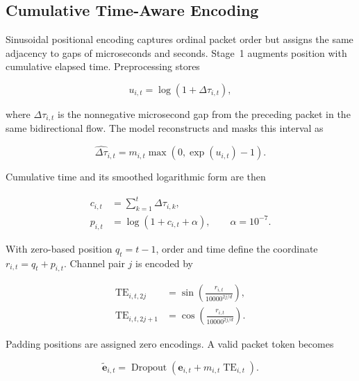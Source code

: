 \documentclass[11pt,fleqn]{report}
\begin{document}
\subsection{Cumulative Time-Aware Encoding}
\label{subsubsec:time_aware_encoding}

Sinusoidal positional encoding captures ordinal packet order but assigns the same adjacency to gaps of microseconds and seconds. Stage~1 augments position with cumulative elapsed time. Preprocessing stores

\begin{equation}
    u_{i,t}=\log\left(1+\Delta\tau_{i,t}\right),
    \label{eq:stored_log_iat}
\end{equation}

where $\Delta\tau_{i,t}$ is the nonnegative microsecond gap from the preceding packet in the same bidirectional flow. The model reconstructs and masks this interval as

\begin{equation}
    \widehat{\Delta\tau}_{i,t}
    =m_{i,t}\max\left(0,\exp(u_{i,t})-1\right).
    \label{eq:reconstructed_iat}
\end{equation}

Cumulative time and its smoothed logarithmic form are then

\begin{align}
    c_{i,t} &= \sum_{k=1}^{t}\widehat{\Delta\tau}_{i,k},\\
    p_{i,t} &= \log\left(1+c_{i,t}+\alpha\right),
    \qquad \alpha=10^{-7}.
    \label{eq:cumulative_time_feature}
\end{align}

With zero-based position $q_t=t-1$, order and time define the coordinate $r_{i,t}=q_t+p_{i,t}$. Channel pair $j$ is encoded by

\begin{align}
    \operatorname{TE}_{i,t,2j}
    &=\sin\left(
        \frac{r_{i,t}}{10000^{2j/d}}
      \right),\\
    \operatorname{TE}_{i,t,2j+1}
    &=\cos\left(
        \frac{r_{i,t}}{10000^{2j/d}}
      \right).
    \label{eq:time_aware_sinusoid}
\end{align}

Padding positions are assigned zero encodings. A valid packet token becomes

\begin{equation}
    \widetilde{\mathbf{e}}_{i,t}
    =\operatorname{Dropout}
    \left(
        \mathbf{e}_{i,t}+m_{i,t}\operatorname{TE}_{i,t}
    \right).
    \label{eq:time_encoded_packet}
\end{equation}
\end{document}

